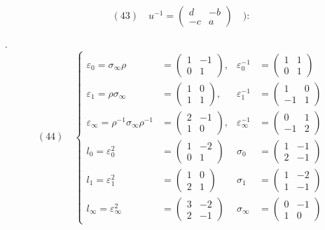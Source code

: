 
\[
(43)\quad u^{-1}=\begin{pmatrix}d&-b\\-c&a\end{pmatrix}\quad):
\]


.
\[
(44)\quad\left\{\begin{aligned}
\varepsilon_0=\sigma_\infty\rho&=\begin{pmatrix}1&-1\\0&1\end{pmatrix},&
\varepsilon_0^{-1}&=\begin{pmatrix}1&1\\0&1\end{pmatrix}\\
\varepsilon_1=\rho\sigma_\infty&=\begin{pmatrix}1&0\\1&1\end{pmatrix},&
\varepsilon_1^{-1}&=\begin{pmatrix}1&0\\-1&1\end{pmatrix}\\
\varepsilon_\infty=\rho^{-1}\sigma_\infty\rho^{-1}&=\begin{pmatrix}2&-1\\1&0\end{pmatrix},&
\varepsilon_\infty^{-1}&=\begin{pmatrix}0&1\\-1&2\end{pmatrix}\\
l_0=\varepsilon_0^2&=\begin{pmatrix}1&-2\\0&1\end{pmatrix}&
\sigma_0&=\begin{pmatrix}1&-1\\2&-1\end{pmatrix}\\
l_1=\varepsilon_1^2&=\begin{pmatrix}1&0\\2&1\end{pmatrix}&
\sigma_1&=\begin{pmatrix}1&-2\\1&-1\end{pmatrix}\\
l_\infty=\varepsilon_\infty^2&=\begin{pmatrix}3&-2\\2&-1\end{pmatrix}&
\sigma_\infty&=\begin{pmatrix}0&-1\\1&0\end{pmatrix}
\end{aligned}\right.
\]
